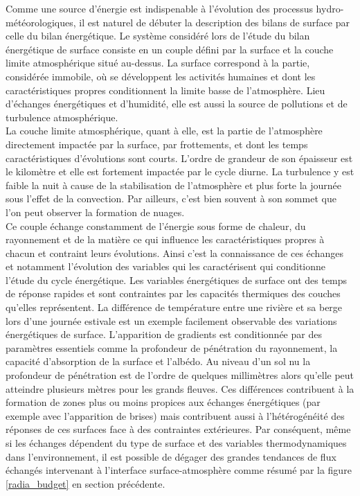 Comme une source d'énergie est indispenable à l'évolution des processus hydro-météorologiques, il est naturel de débuter la description des bilans de surface par celle du bilan énergétique. Le système considéré lors de l'étude du bilan énergétique de surface consiste en un couple défini par la surface et la couche limite atmosphérique situé au-dessus. La surface correspond à la partie, considérée immobile, où se développent les activités humaines et dont les caractéristiques propres conditionnent la limite basse de l'atmosphère. Lieu d'échanges énergétiques et d'humidité, elle est aussi la source de pollutions et de turbulence atmosphérique.\\
La couche limite atmosphérique, quant à elle, est la partie de l'atmosphère directement impactée par la surface, par frottements, et dont les temps caractéristiques d'évolutions sont courts. L'ordre de grandeur de son épaisseur est le kilomètre et elle est fortement impactée par le cycle diurne. La turbulence y est faible la nuit à cause de la stabilisation de l'atmosphère et plus forte la journée sous l'effet de la convection. Par ailleurs, c'est bien souvent à son sommet que l'on peut observer la formation de nuages. \\

Ce couple échange constamment de l'énergie sous forme de chaleur, du rayonnement et de la matière ce qui influence les caractéristiques propres à chacun et contraint leurs évolutions. Ainsi c'est la connaissance de ces échanges et notamment l'évolution des variables qui les caractérisent qui conditionne l'étude du cycle énergétique. Les variables énergétiques de surface ont des temps de réponse rapides et sont contraintes par les capacités thermiques des couches qu'elles représentent. La différence de température entre une rivière et sa berge lors d'une journée estivale est un exemple facilement observable des variations énergétiques de surface. L'apparition de gradients est conditionnée par des paramètres essentiels comme la profondeur de pénétration du rayonnement, la capacité d'absorption de la surface et l'albédo. Au niveau d'un sol nu la profondeur de pénétration est de l'ordre de quelques millimètres alors qu'elle peut atteindre plusieurs mètres pour les grands fleuves. Ces différences contribuent à la formation de zones plus ou moins propices aux échanges énergétiques (par exemple avec l'apparition de brises) mais contribuent aussi à l'hétérogénéité des réponses de ces surfaces face à des contraintes extérieures. Par conséquent, même si les échanges dépendent du type de surface et des variables thermodynamiques dans l'environnement, il est possible de dégager des grandes tendances de flux échangés intervenant à l'interface surface-atmosphère comme résumé par la figure \ref{radia_budget} en section précédente.
\\

